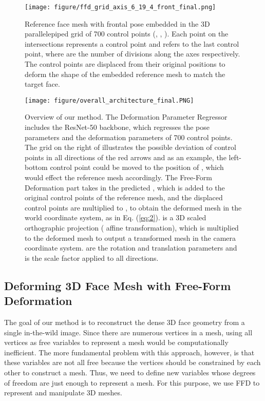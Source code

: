 \documentclass[letterpaper, 10 pt, conference]{ieeeconf}
\begin{document}
\begin{figure}[t]
    \centering
\texttt{[image: figure/ffd\_grid\_axis\_6\_19\_4\_front\_final.png]}
    \caption{Reference face mesh with frontal pose embedded in the 3D parallelepiped grid of 700 control points (, , ). Each point on the intersections represents a control point and  refers to the last control point, where  are the number of divisions along the  axes respectively. The control points are displaced from their original positions to deform the shape of the embedded reference mesh to match the target face.}\label{fig:1}
\end{figure}


\begin{figure*}[t]
\centering
\texttt{[image: figure/overall\_architecture\_final.PNG]}
\caption{Overview of our method. The Deformation Parameter Regressor includes the ResNet-50 backbone, which regresses the pose parameters  and the deformation parameters  of 700 control points. The grid on the right of  illustrates the possible deviation of control points in all directions of the red arrows and as an example, the left-bottom control point  could be moved to the position of , which would effect the reference mesh accordingly. The Free-Form Deformation part takes in the predicted , which is added to the original control points  of the reference mesh, and the displaced control points are multiplied to , to obtain the deformed mesh in the world coordinate system, as in Eq. (\ref{eq:2}).  is a 3D scaled orthographic projection ( affine transformation), which is multiplied to the deformed mesh to output a transformed mesh in the camera coordinate system.  are the rotation and translation parameters and  is the scale factor applied to all  directions.}\label{fig:2}
\end{figure*}

\subsection{Deforming 3D Face Mesh with Free-Form Deformation}
The goal of our method is to reconstruct the dense 3D face geometry from a single in-the-wild image. Since there are numerous vertices in a mesh, using all vertices as free variables to represent a mesh would be computationally inefficient. The more fundamental problem with this approach, however, is that these variables are not all free because the vertices should be constrained by each other to construct a mesh. Thus, we need to define new variables whose degrees of freedom are just enough to represent a mesh. 
For this purpose, we use FFD to represent and manipulate 3D meshes.
\par
\end{document}

